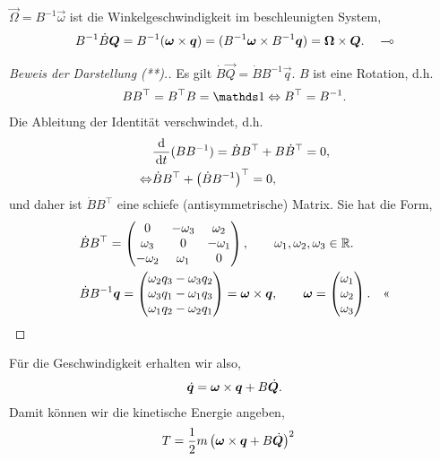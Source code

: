 \begin{enumerate}[label=\arabic{*})]
\begin{bemn}
$\vec{\Omega}=B^{-1}\vec{\omega}$ ist die Winkelgeschwindigkeit im
beschleunigten System,
\begin{align*}
B^{-1}\dot{B}\bm{Q} = B^{-1}(\bm{\omega}\times \bm{q}) =
(B^{-1}\bm{\omega}\times B^{-1}\bm{q}) = \bm{\Omega}\times\bm{Q}.\quad\multimap
\end{align*}
\end{bemn}
\begin{proof}[Beweis der Darstellung (**).]
Es gilt $\dot{B}\vec{Q} = \dot{B}B^{-1}\vec{q}$. $B$ ist eine Rotation, d.h.
\begin{align*}
B B^\top = B^\top B = \Id \Leftrightarrow B^\top = B^{-1}.
\end{align*}
Die Ableitung der Identität verschwindet, d.h.
\begin{align*}
&\frac{\mathrm{d}}{\,\mathrm{d} t\,}(B B^{-1}) = \dot{B}B^\top  + B\dot{B}^\top = 0,\\
\Leftrightarrow & \dot{B}B^\top  + \left(\dot{B}B^{-1}\right)^\top = 0,
\end{align*}
und daher ist $\dot{B} B^\top$ eine schiefe (antisymmetrische) Matrix. Sie hat
die Form,
\begin{align*}
&\dot{B}B^\top = 
\begin{pmatrix}
0 & -\omega_3 & \omega_2\\
\omega_3 & 0 & -\omega_1\\
-\omega_2 & \omega_1 & 0
\end{pmatrix},\qquad \omega_1,\omega_2,\omega_3\in\mathbb{R}.\\
&\dot{B}B^{-1}\bm{q} = 
\begin{pmatrix}
\omega_2 q_3 - \omega_3 q_2\\
\omega_3 q_1 - \omega_1 q_3\\
\omega_1 q_2 - \omega_2 q_1
\end{pmatrix}
= \bm{\omega}\times \bm{q},\qquad \bm{\omega} =
\begin{pmatrix}\omega_1\\\omega_2\\\omega_3\end{pmatrix}.\quad\text{<<}
\end{align*}
\end{proof}
Für die Geschwindigkeit erhalten wir also,
\begin{align*}
\dot{\bm{q}} = \bm{\omega}\times\bm{q} + B\dot{\bm{Q}}.
\end{align*}
Damit können wir die kinetische Energie angeben,
\begin{align*}
T &= \frac{1}{2}m\left(\vec{\omega}\times \vec{q} + B\dvec{Q} \right)^2

\end{align*}
\end{enumerate}
